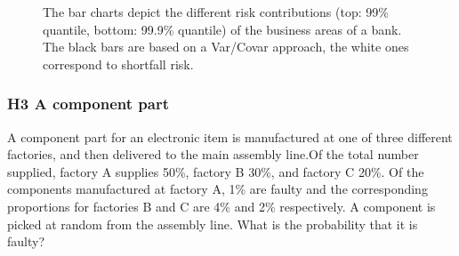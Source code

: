 \begin{figure}
\begin{center}
\end{center}
\caption[The bar charts depict the different risk contributions]{The bar charts depict the different risk contributions (top: 99\% quantile, bottom: 99.9\% quantile) of the business areas of a bank. The black bars
are based on a Var/Covar approach, the white ones correspond to shortfall risk.}
\end{figure}

\subsubsection{H3 A component part }
A component part for an electronic item is
manufactured at one of three \cite{mardia1979ma} different factories, and then delivered to
the main assembly line.Of the total number supplied, factory A supplies
50\%, factory B 30\%, and factory C 20\%. Of the components
manufactured at factory A, 1\% are faulty and the corresponding
proportions for factories B and C are 4\% and 2\% respectively. A
component is picked at random from the assembly line. What is the
probability that it is faulty?


